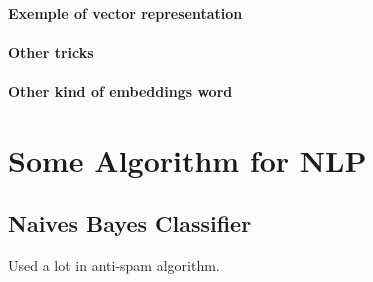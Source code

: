 			\paragraph*{Exemple of vector representation}
		
			\paragraph*{Other tricks}

			\paragraph*{Other kind of embeddings word}



	\section{Some Algorithm for NLP}

		\subsection{Naives Bayes Classifier}

		Used a lot in anti-spam algorithm.

		
